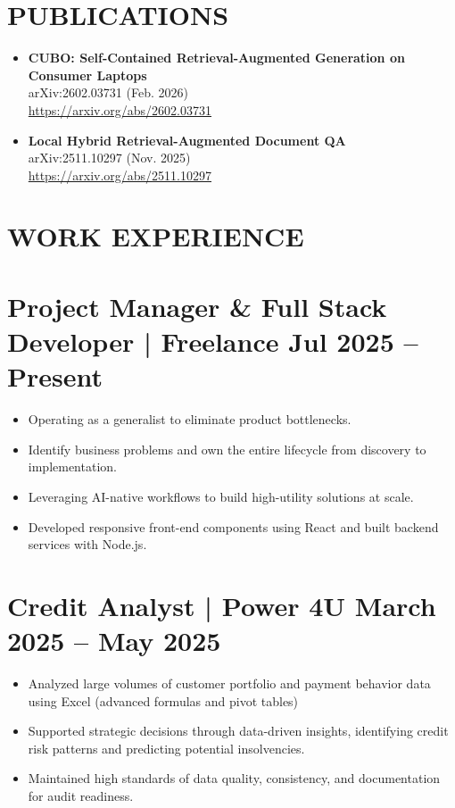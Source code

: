 \documentclass[a4paper,10pt]{article}
\newcommand{\datedsection}[2]{%
  \section*{#1 \hfill \small #2}%
}
\begin{document}
\section*{PUBLICATIONS}
\begin{itemize}[leftmargin=*, label={$\bullet$}]
    \item \textbf{CUBO: Self-Contained Retrieval-Augmented Generation on Consumer Laptops} \\
        arXiv:2602.03731 (Feb. 2026) \\
        \href{https://arxiv.org/abs/2602.03731}{https://arxiv.org/abs/2602.03731}
    \item \textbf{Local Hybrid Retrieval-Augmented Document QA} \\
        arXiv:2511.10297 (Nov. 2025) \\
        \href{https://arxiv.org/abs/2511.10297}{https://arxiv.org/abs/2511.10297}
\end{itemize}

\section*{WORK EXPERIENCE}
\datedsection{Project Manager \& Full Stack Developer | Freelance}{Jul 2025 -- Present}
\begin{itemize}[leftmargin=*, label={$\bullet$}]
    \item Operating as a generalist to eliminate product bottlenecks.
    \item Identify business problems and own the entire lifecycle from discovery to implementation.
    \item Leveraging AI-native workflows to build high-utility solutions at scale.
    \item Developed responsive front-end components using React and built backend services with Node.js.
\end{itemize}

\datedsection{Credit Analyst | Power 4U}{March 2025 -- May 2025}
\begin{itemize}[leftmargin=*, label={$\bullet$}]
    \item Analyzed large volumes of customer portfolio and payment behavior data using Excel (advanced formulas and pivot tables)
    \item Supported strategic decisions through data-driven insights, identifying credit risk patterns and predicting potential insolvencies.
    \item Maintained high standards of data quality, consistency, and documentation for audit readiness.
\end{itemize}
\end{document}
